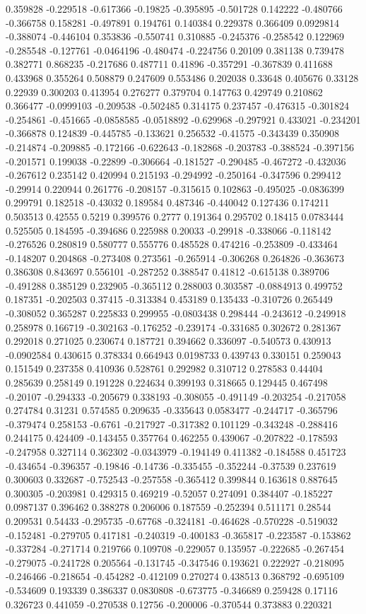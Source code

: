 0.359828 -0.229518 -0.617366 -0.19825 -0.395895 -0.501728 0.142222 -0.480766 -0.366758 0.158281 -0.497891 0.194761 0.140384 0.229378 0.366409 0.0929814 -0.388074 -0.446104 0.353836 -0.550741 0.310885 -0.245376 -0.258542 0.122969 -0.285548 -0.127761 -0.0464196 -0.480474 -0.224756 0.20109 0.381138 0.739478 0.382771 0.868235 -0.217686 0.487711 0.41896 -0.357291 -0.367839 0.411688 0.433968 0.355264 0.508879 0.247609 0.553486 0.202038 0.33648 0.405676 0.33128 0.22939 0.300203 0.413954 0.276277 0.379704 0.147763 0.429749 0.210862 0.366477 -0.0999103 -0.209538 -0.502485 0.314175 0.237457 -0.476315 -0.301824 -0.254861 -0.451665 -0.0858585 -0.0518892 -0.629968 -0.297921 0.433021 -0.234201 -0.366878 0.124839 -0.445785 -0.133621 0.256532 -0.41575 -0.343439 0.350908 -0.214874 -0.209885 -0.172166 -0.622643 -0.182868 -0.203783 -0.388524 -0.397156 -0.201571 0.199038 -0.22899 -0.306664 -0.181527 -0.290485 -0.467272 -0.432036 -0.267612 0.235142 0.420994 0.215193 -0.294992 -0.250164 -0.347596 0.299412 -0.29914 0.220944 0.261776 -0.208157 -0.315615 0.102863 -0.495025 -0.0836399 0.299791 0.182518 -0.43032 0.189584 0.487346 -0.440042 0.127436 0.174211 0.503513 0.42555 0.5219 0.399576 0.2777 0.191364 0.295702 0.18415 0.0783444 0.525505 0.184595 -0.394686 0.225988 0.20033 -0.29918 -0.338066 -0.118142 -0.276526 0.280819 0.580777 0.555776 0.485528 0.474216 -0.253809 -0.433464 -0.148207 0.204868 -0.273408 0.273561 -0.265914 -0.306268 0.264826 -0.363673 0.386308 0.843697 0.556101 -0.287252 0.388547 0.41812 -0.615138 0.389706 -0.491288 0.385129 0.232905 -0.365112 0.288003 0.303587 -0.0884913 0.499752 0.187351 -0.202503 0.37415 -0.313384 0.453189 0.135433 -0.310726 0.265449 -0.308052 0.365287 0.225833 0.299955 -0.0803438 0.298444 -0.243612 -0.249918 0.258978 0.166719 -0.302163 -0.176252 -0.239174 -0.331685 0.302672 0.281367 0.292018 0.271025 0.230674 0.187721 0.394662 0.336097 -0.540573 0.430913 -0.0902584 0.430615 0.378334 0.664943 0.0198733 0.439743 0.330151 0.259043 0.151549 0.237358 0.410936 0.528761 0.292982 0.310712 0.278583 0.44404 0.285639 0.258149 0.191228 0.224634 0.399193 0.318665 0.129445 0.467498 -0.20107 -0.294333 -0.205679 0.338193 -0.308055 -0.491149 -0.203254 -0.217058 0.274784 0.31231 0.574585 0.209635 -0.335643 0.0583477 -0.244717 -0.365796 -0.379474 0.258153 -0.6761 -0.217927 -0.317382 0.101129 -0.343248 -0.288416 0.244175 0.424409 -0.143455 0.357764 0.462255 0.439067 -0.207822 -0.178593 -0.247958 0.327114 0.362302 -0.0343979 -0.194149 0.411382 -0.184588 0.451723 -0.434654 -0.396357 -0.19846 -0.14736 -0.335455 -0.352244 -0.37539 0.237619 0.300603 0.332687 -0.752543 -0.257558 -0.365412 0.399844 0.163618 0.887645 0.300305 -0.203981 0.429315 0.469219 -0.52057 0.274091 0.384407 -0.185227 0.0987137 0.396462 0.388278 0.206006 0.187559 -0.252394 0.511171 0.28544 0.209531 0.54433 -0.295735 -0.67768 -0.324181 -0.464628 -0.570228 -0.519032 -0.152481 -0.279705 0.417181 -0.240319 -0.400183 -0.365817 -0.223587 -0.153862 -0.337284 -0.271714 0.219766 0.109708 -0.229057 0.135957 -0.222685 -0.267454 -0.279075 -0.241728 0.205564 -0.131745 -0.347546 0.193621 0.222927 -0.218095 -0.246466 -0.218654 -0.454282 -0.412109 0.270274 0.438513 0.368792 -0.695109 -0.534609 0.193339 0.386337 0.0830808 -0.673775 -0.346689 0.259428 0.17116 0.326723 0.441059 -0.270538 0.12756 -0.200006 -0.370544 0.373883 0.220321 